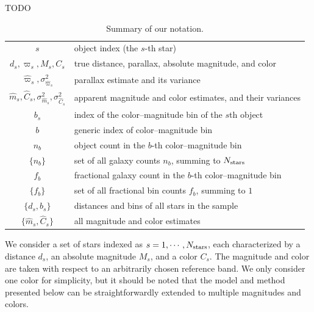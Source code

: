 \documentclass[manuscript, letterpaper]{aastex6}
\makeatletter
\let\origsection\section
\renewcommand\section{\@ifstar{\starsection}{\nostarsection}}
\newcommand\nostarsection[1]{\sectionprelude\origsection{#1}}
\newcommand\starsection[1]{\sectionprelude\origsection*{#1}}
\newcommand\sectionprelude{\vspace{1em}}
\newcommand{\nobj}{{N_{\rm stars}}}
\makeatother
\begin{document}
\section{Introduction}

TODO


\section{Model}


\begin{table} %
\centering
\begin{tabular}{cl}
\hline
$s$	&	object index (the $s$-th star)\\
$d_s, \varpi_s, M_s, C_s$	&	true distance, parallax, absolute magnitude, and color	\\
$\hat{\varpi}_s, \sigma_{\hat{\varpi}_s}^2$ 	&	parallax estimate and its variance\\
$\hat{m}_s, \hat{C}_s, \sigma^2_{\hat{m}_s}, \sigma^2_{\hat{C}_s}$ 	&	apparent magnitude and color estimates, and their variances\\
$b_s$	&	index of the color--magnitude bin of the $s$th object\\
\hline
$b$	&	generic index of color--magnitude bin\\
$n_b$	& 	object count in the $b$-th color--magnitude bin  \\
$\{n_b\}$	&	set of all galaxy counts $n_b$, summing to $\nobj$\\
$f_b$	&	fractional galaxy count in the $b$-th color--magnitude bin  \\
$\{f_b\}$	&	set of all fractional bin counts $f_b$, summing to $1$\\
$\{ d_s, b_s\}$	&	distances and bins of all stars in the sample	\\
$\{ \hat{m}_s, \hat{C}_s \}$ &	all magnitude and color estimates\\
\hline
\end{tabular}
\caption{Summary of our notation. }
\label{tab:notation}
\end{table} 

We consider a set of stars indexed as $s=1, \cdots, \nobj$, each characterized by a distance $d_s$, an absolute magnitude $M_s$, and a color $C_s$. 
The magnitude and color are taken with respect to an arbitrarily chosen reference band.
We only consider one color for simplicity, but it should be noted that the model and method presented below can be straightforwardly extended to multiple magnitudes and colors.
\end{document}
